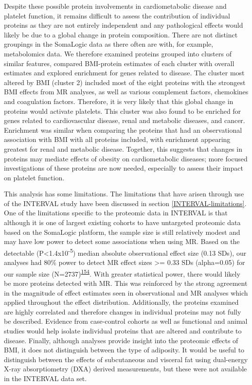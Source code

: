 \documentclass[11pt,twoside]{bristolthesis}
\begin{document}
Despite these possible protein involvements in cardiometabolic disease and platelet function, it remains difficult to assess the contribution of individual proteins as they are not entirely independent and any pathological effects would likely be due to a global change in protein composition. There are not distinct groupings in the SomaLogic data as there often are with, for example, metabolomics data. We therefore examined proteins grouped into clusters of similar features, compared BMI-protein estimates of each cluster with overall estimates and explored enrichment for genes related to disease. The cluster most altered by BMI (cluster 2) included most of the eight proteins with the strongest BMI effects from MR analyses, as well as various complement factors, chemokines and coagulation factors. Therefore, it is very likely that this global change in proteins would activate platelets. This cluster was also found to be enriched for genes related to cardiovascular disease, renal and metabolic diseases, and cancer. Enrichment was similar when comparing the proteins that had an observational association with BMI with all proteins included, with enrichment appearing greatest for renal and metabolic disease. Together, this suggests that changes in proteins may mediate effects of obesity on cardiometabolic diseases; more focused investigations of these proteins are now needed, especially to assess their impact on platelet function.

This analysis has some limitations. The limitations that have arisen through use of the INTERVAL study have been discussed in section \ref{INTERVAL-limitations}. One of the limitations specific to the proteomic data in INTERVAL is that although it is one of largest existing cohorts to have untargeted proteomic data based on the SomaLogic platform, the sample size is still relatively modest and may have low power to detect some associations when using MR. Based on the detectable (P\textless1.4x10\textsuperscript{-5}) median absolute observational effect size (0.13 SDs), our analyses had 80\% power to detect MR effect sizes \textgreater= 0.33 SDs (alpha=0.05) for our sample size (N=2737)\textsuperscript{\protect\hyperlink{ref-Brion2013}{154}}. With greater statistical power, there would likely be more proteins detected with MR. This was reinforced by the strong agreement in the magnitude of effect estimates seen in observational and MR analyses which applied throughout the effect distribution. Additionally, the proteins examined are highly correlated and therefore changes in individual proteins may not fully be described. Evidence from case-control cohorts as well as functional and animal studies would help isolate individual proteins that are altered and contribute to disease. Finally, although analyses provide insight into the proteomic effects of BMI, it does not distinguish between the type of adiposity. It would be useful to distinguish between the effects of subcutaneous and visceral fat using dual-energy X-ray absorptiometry (DXA) derived measurements, but these were not available in the INTERVAL data set.
\end{document}
